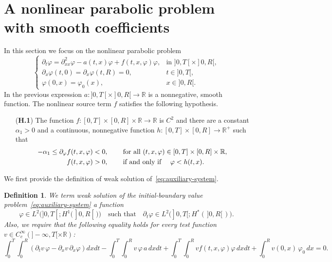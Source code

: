 \documentclass[11pt,leqno]{amsart}
\newtheorem{definition}{Definition}[section]
\numberwithin{equation}{section}
\begin{document}
\section{A nonlinear parabolic problem with smooth coefficients}
\label{sec:2}
In this section we focus on the nonlinear parabolic problem
\begin{equation}
\label{eq:auxiliary-system}
\begin{cases}
{\partial_t} {\varphi} = {\partial_{xx}^2} {\varphi} - a (t, x) {\varphi} + f(t, x, {\varphi}) {\varphi}, & \text{in $]0, T[ \times ]0, R[$} ,  \\
{\partial_x } {\varphi}(t,0)={\partial_x }{\varphi}(t,R) = 0, & t \in ]0, T[, \\
{\varphi}(0,x) = {\varphi}_0(x), & x \in {]0,R[}.
    \end{cases}
\end{equation}
In the previous expression $a: ]0, T[ \times ]0, R[ \to {\mathbb{R}}$ is a nonnegative, smooth function. The nonlinear source term $f$ satisfies the following hypothesis.  
\begin{itemize}
\item[({\bf H.1})] \label{h:accauno}
 The function $f:[0,T] \times [0,R] \times {\mathbb{R}} \to {\mathbb{R}}$
  is $C^2$ and there are a constant $\alpha_1 >0$ and a 
 continuous, nonnegative function $h:[0,T]\times[0,R]\to {\mathbb{R}}^+$
 such that  
 \begin{align}
   
    
    
    
    \label{eq:2.2}
    -\alpha_1\le{\partial}_{\varphi} f  (t,x,{\varphi})<0, 
    & \qquad \hbox{ for all } (t,x,{\varphi})\in [0,T]
    \times[0,R]\times{\mathbb{R}},
    \\
    \label{eq:2.3}
    f(t,x,{\varphi})> 0, 
    & \qquad \text{ if and only if }\quad {\varphi}< h(t,x).
  \end{align}
\end{itemize}
We first provide the definition of weak solution of~\eqref{eq:auxiliary-system}. 
\begin{definition}
\label{d:uno}
We term \emph{weak solution} of the initial-boundary value problem~\eqref{eq:auxiliary-system} a function  
\begin{equation}
\label{e:dentrospazi}
         \varphi \in L^2 \big( ]0, T[ ; H^1 ( \, ]0, R[ \, ) \big) \quad \text{such that} \quad
          \partial_t {\varphi} \in L^2 \big( ]0, T[ ; H^\ast ( \, ]0, R[ \, ) \big).
\end{equation} 
Also, we require that the following equality holds
for every test function $v \in C_c^\infty(]-\infty,T[ \times {\mathbb{R}})$:
\begin{equation}
  \label{e:distrform}
  \int_0^T \!\!\!\int_0^R 
  \!\left({\partial_t} v \,  {\varphi}-{\partial_x } v\, {\partial_x } {\varphi} \right) dx dt
  - \int_0^T\!\!\! \int_0^R \! v \, {\varphi} \, a \, dx dt 
  +\!\int_0^T \!\!\! \int_0^R \! v f (t, x,  {\varphi}) {\varphi} \, dxdt+
  \!\int_0^R \!v(0, x )\, {\varphi}_0 \, dx=0.
\end{equation}
\end{definition}
\end{document}
